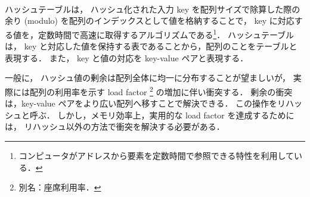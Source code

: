\thispagestyle{empty} %

　\\
\\
\\
\\
\\
\\
\\
\\

ハッシュテーブルは，
ハッシュ化された入力 key を配列サイズで除算した際の余り (modulo) を配列のインデックスとして値を格納することで，
key に対応する値を，定数時間で高速に取得するアルゴリズムである\footnote{コンピュータがアドレスから要素を定数時間で参照できる特性を利用している．}．
ハッシュテーブルは， key と対応した値を保持する表であることから，配列のことをテーブルと表現する．
また， key と値の対応を key-value ペアと表現する．

一般に，
ハッシュ値の剰余は配列全体に均一に分布することが望ましいが，
実際には配列の利用率を示す load factor \footnote{別名：座席利用率．} の増加に伴い衝突する．
剰余の衝突は，key-value ペアをより広い配列へ移すことで解決できる．
この操作をリハッシュと呼ぶ．
しかし，メモリ効率上，実用的な load factor を達成するためには，
リハッシュ以外の方法で衝突を解決する必要がある．

